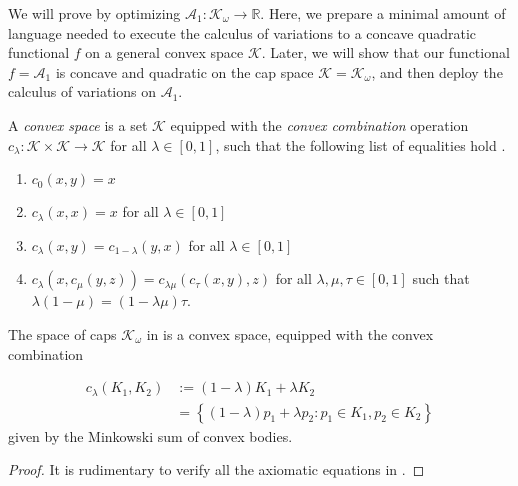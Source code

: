 We will prove  by optimizing \(\mathcal{A}_1 : \mathcal{K}_\omega \to \mathbb{R}\). Here, we prepare a minimal amount of language needed to execute the calculus of variations to a concave quadratic functional \(f\) on a general convex space \(\mathcal{K}\). Later, we will show that our functional \(f = \mathcal{A}_1\) is concave and quadratic on the cap space \(\mathcal{K} = \mathcal{K}_\omega\), and then deploy the calculus of variations on \(\mathcal{A}_1\).

\begin{definition}

A \emph{convex space} is a set \(\mathcal{K}\) equipped with the \emph{convex combination} operation \(c_\lambda : \mathcal{K} \times \mathcal{K} \to \mathcal{K}\) for all \(\lambda \in [0, 1]\), such that the following list of equalities hold \cite{nlab-convex-space}.

\begin{enumerate}
\def\labelenumi{\arabic{enumi}.}
\tightlist
\item
  \(c_0(x, y) = x\)
\item
  \(c_\lambda(x, x) = x\) for all \(\lambda \in [0, 1]\)
\item
  \(c_\lambda (x, y) = c_{1 - \lambda}(y, x)\) for all \(\lambda \in [0, 1]\)
\item
  \(c_\lambda(x, c_\mu(y, z)) = c_{\lambda \mu} (c_\tau(x, y), z)\) for all \(\lambda, \mu, \tau \in [0, 1]\) such that \(\lambda (1 - \mu) = (1 - \lambda \mu) \tau\).
\end{enumerate}

\label{def:convex-space}
\end{definition}

\begin{proposition}

The space of caps \(\mathcal{K}_\omega\) in  is a convex space, equipped with the convex combination

\begin{align*}
c_\lambda(K_1, K_2) & := (1 - \lambda)K_1 + \lambda K_2 \\
& = \left\{ (1 - \lambda) p_1 + \lambda p_2 : p_1 \in K_1, p_2 \in K_2 \right\} 
\end{align*}
given by the Minkowski sum of convex bodies.

\label{pro:cap-space-convex-space}
\end{proposition}

\begin{proof}
It is rudimentary to verify all the axiomatic equations in .
\end{proof}

